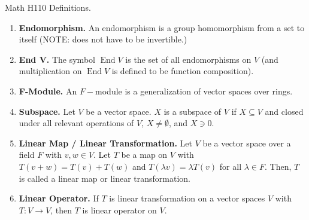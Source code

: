 \documentclass[12pt]{article}
\theoremstyle{definition}
\theoremstyle{named}
\DeclareMathOperator{\End}{End}
\begin{document}
\begin{center}
    Math H110 Definitions. 
\end{center}

\begin{enumerate}
    \item \textbf{Endomorphism. } An endomorphism is a group homomorphism from a set to itself (NOTE: does not have to be invertible.)
    \item \textbf{End V. } The symbol $\End V$ is the set of all endomorphisms on $V$ (and multiplication on $\End V$ is defined to be function composition). 
    \item \textbf{F-Module. } An $F-$module is a generalization of vector spaces over rings. 
    \item \textbf{Subspace. } Let $V$ be a vector space. $X$ is a subspace of $V$ if $X \subseteq V$ and closed under all relevant operations of $V$, $X \neq \emptyset$, and $X \ni 0$. 
    \item \textbf{Linear Map / Linear Transformation. } Let $V$ be a vector space over a field $F$ with $v,w \in V$. Let $T$ be a map on $V$ with $T(v+w) = T(v) + T(w)$ and $T(\lambda v) = \lambda T(v)$ for all $\lambda \in F$. Then, $T$ is called a linear map or linear transformation. 
    \item \textbf{Linear Operator. } If $T$ is linear transformation on a vector spaces $V$ with $T: V \to V$, then $T$ is linear operator on $V$. 
\end{enumerate}
\end{document}
